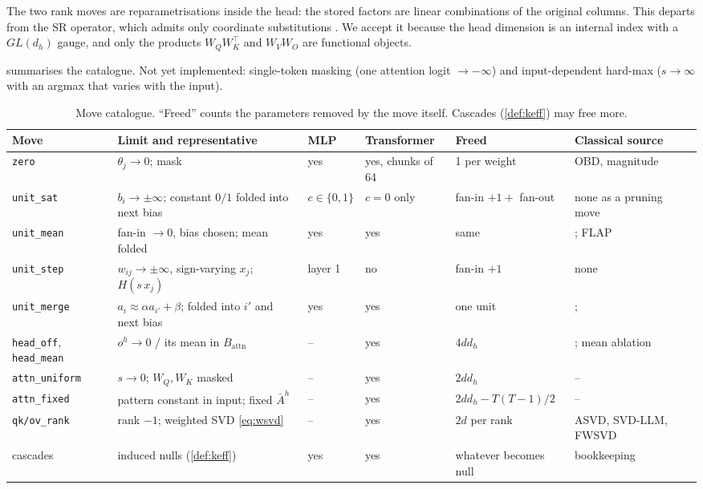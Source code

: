 \documentclass[11pt,a4paper]{article}
\theoremstyle{definition}
\newcommand{\code}[1]{\texttt{#1}}
\begin{document}
The two rank moves are reparametrisations inside the head: the stored factors are
linear combinations of the original columns. This departs from the SR operator, which
admits only coordinate substitutions \citep{guidetti2026emergent}. We accept it
because the head dimension is an internal index with a $GL(d_h)$ gauge, and only the
products $W_QW_K^{\top}$ and $W_VW_O$ are functional objects.

 summarises the catalogue. Not yet implemented: single-token masking
(one attention logit $\to-\infty$) and input-dependent hard-max ($s\to\infty$ with an
argmax that varies with the input).

\begin{table}[t]
\centering\footnotesize
\caption{Move catalogue. ``Freed'' counts the parameters removed by the move itself.
Cascades (\cref{def:keff}) may free more.}
\label{tab:moves}
\renewcommand{\arraystretch}{1.2}
\begin{tabularx}{\textwidth}{@{}p{2.15cm}Xp{1.35cm}p{2.0cm}p{2.0cm}p{2.5cm}@{}}
\toprule
\textbf{Move} & \textbf{Limit and representative} & \textbf{MLP} & \textbf{Transformer} & \textbf{Freed} & \textbf{Classical source}\\
\midrule
\code{zero} & $\theta_j\to0$; mask & yes & yes, chunks of 64 & 1 per weight & OBD, magnitude\\
\code{unit\_sat} & $b_i\to\pm\infty$; constant $0/1$ folded into next bias & $c\in\{0,1\}$ & $c=0$ only & fan-in $+1+$ fan-out & none as a pruning move\\
\code{unit\_mean} & fan-in $\to0$, bias chosen; mean folded & yes & yes & same & \citet{sietsma1988pruning}; FLAP\\
\code{unit\_step} & $w_{ij}\to\pm\infty$, sign-varying $x_j$; $H(s\,x_j)$ & layer 1 & no & fan-in $+1$ & none\\
\code{unit\_merge} & $a_i\approx\alpha a_{i'}+\beta$; folded into $i'$ and next bias & yes & yes & one unit & \citet{sietsma1988pruning}; \citet{kim2020merging}\\
\code{head\_off}, \code{head\_mean} & $o^h\to0$ / its mean in $B_{\mathrm{attn}}$ & -- & yes & $4dd_h$ & \citet{michel2019sixteen}; mean ablation\\
\code{attn\_uniform} & $s\to0$; $W_Q,W_K$ masked & -- & yes & $2dd_h$ & --\\
\code{attn\_fixed} & pattern constant in input; fixed $\bar A^h$ & -- & yes & $2dd_h-T(T{-}1)/2$ & --\\
\code{qk/ov\_rank} & rank $-1$; weighted SVD \eqref{eq:wsvd} & -- & yes & $2d$ per rank & ASVD, SVD-LLM, FWSVD\\
cascades & induced nulls (\cref{def:keff}) & yes & yes & whatever becomes null & bookkeeping\\
\bottomrule
\end{tabularx}
\end{table}
\end{document}
